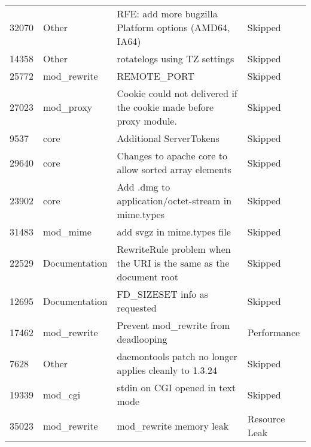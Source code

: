\begin{longtable}[c]{llll}
32070  & Other              & RFE: add more bugzilla Platform options (AMD64, IA64)                                                          & Skipped           \\
14358  & Other              & rotatelogs using TZ settings                                                                                   & Skipped           \\
25772  & mod\_rewrite       & REMOTE\_PORT                                                                                                   & Skipped           \\
27023  & mod\_proxy         & Cookie could not delivered if the cookie made before proxy module.                                             & Skipped           \\
9537   & core               & Additional ServerTokens                                                                                        & Skipped           \\
29640  & core               & Changes to apache core to allow sorted array elements                                                          & Skipped           \\
23902  & core               & Add .dmg to application/octet-stream in mime.types                                                             & Skipped           \\
31483  & mod\_mime          & add svgz in mime.types file                                                                                    & Skipped           \\
22529  & Documentation      & RewriteRule problem when the URI is the same as the document root                                              & Skipped           \\
12695  & Documentation      & FD\_SIZESET info as requested                                                                                  & Skipped           \\
17462  & mod\_rewrite       & Prevent mod\_rewrite from deadlooping                                                                          & Performance       \\
7628   & Other              & daemontools patch no longer applies cleanly to 1.3.24                                                          & Skipped           \\
19339  & mod\_cgi           & stdin on CGI opened in text mode                                                                               & Skipped           \\
35023  & mod\_rewrite       & mod\_rewrite memory leak                                                                                       & Resource Leak    
\end{longtable}

